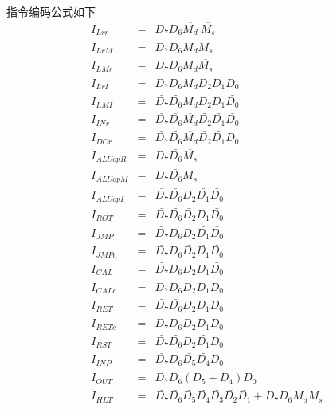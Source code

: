 \documentclass[10pt]{book}
\begin{document}
指令编码公式如下
\begin{eqnarray}
I_{Lrr}		&=& D_7 D_6\overline{M_d}~\overline{M_s} \\
I_{LrM}		&=& D_7 D_6\overline{M_d}M_s \\
I_{LMr}		&=& D_7 D_6 M_d\overline{M_s} \\
I_{LrI}		&=& \bar{D_7}\bar{D_6}\overline{M_d}D_2 D_1\bar{D_0} \\
I_{LMI}		&=& \bar{D_7}\bar{D_6}M_d D_2 D_1\bar{D_0} \\
I_{INr}		&=& \bar{D_7}\bar{D_6}\overline{M_d}\bar{D_2}\bar{D_1}\bar{D_0} \\
I_{DCr}		&=& \bar{D_7}\bar{D_6}\overline{M_d}\bar{D_2}\bar{D_1}D_0 \\
I_{ALUopR}	&=& D_7\bar{D_6}\overline{M_s} \\
I_{ALUopM}	&=& D_7\bar{D_6}M_s \\
I_{ALUopI}	&=& \bar{D_7}\bar{D_6}D_2\bar{D_1}\bar{D_0} \\
I_{ROT}		&=& \bar{D_7}\bar{D_6}\bar{D_2}D_1\bar{D_0} \\
I_{JMP}		&=& \bar{D_7}D_6 D_2\bar{D_1}\bar{D_0} \\
I_{JMPc}	&=& \bar{D_7}D_6 \bar{D_2}\bar{D_1}\bar{D_0} \\
I_{CAL}		&=& \bar{D_7}D_6 D_2 D_1\bar{D_0} \\
I_{CALc}	&=& \bar{D_7}D_6 \bar{D_2}D_1\bar{D_0} \\
I_{RET}		&=& \bar{D_7}\bar{D_6}D_2 D_1 D_0 \\
I_{RETc}	&=& \bar{D_7}\bar{D_6}\bar{D_2}D_1 D_0 \\
I_{RST}		&=& \bar{D_7}\bar{D_6}D_2\bar{D_1}D_0 \\
I_{INP}		&=& \bar{D_7}D_6\bar{D_5}\bar{D_4}D_0 \\
I_{OUT}		&=& \bar{D_7}D_6(D_5+D_4)D_0 \\
I_{HLT}		&=& \bar{D_7}\bar{D_6}\bar{D_5}\bar{D_4}\bar{D_3}\bar{D_2}\bar{D_1}+D_7 D_6 M_d M_s
\end{eqnarray}
\end{document}
